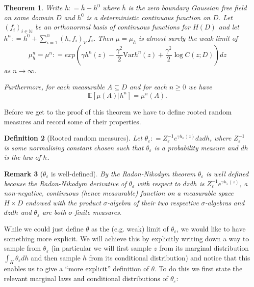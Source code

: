 \documentclass[11pt,reqno]{amsart}
\numberwithin{equation}{section}
\newtheorem{thm}{Theorem}[section]
\newtheorem{defi}[thm]{Definition}
\newtheorem{rem}[thm]{Remark}
\newcommand{\deq}{\mathrel{\mathop:}=}
\newcommand{\eps}{\varepsilon}
\begin{document}
\begin{thm}\label{thm:approximationofhwithhn}
	Write $h\deq \overline h+h^0$ where $\overline h$ is the zero boundary Gaussian free field on some domain $D$ and $h^0$ is a deterministic continuous function on $D$. Let $(f_i)_{i\in\mathbb N}$ be an orthonormal basis of continuous functions for $H(D)$ and let $h^n\deq h^0+\sum_{i=1}^n (h,f_i)_\nabla f_i$. Then $\mu=\mu_h$ is almost surely the weak limit of $$\mu_h^n=\mu^n\deq exp\left(\gamma h^n(z)-\frac{\gamma^2}{2}\text{Var}h^n(z)+\frac{\gamma^2}{2}\log C(z;D) \right)dz$$
	as $n\rightarrow\infty$.
	
	Furthermore, for each measurable $A\subseteq D$ and for each $n\geq 0$ we have $$\mathbb E[\mu(A)|h^n]=\mu^n(A).$$
\end{thm}

Before we get to the proof of this theorem we have to define rooted random measures and record some of their properties.

\begin{defi}[Rooted random measures]
	Let $\theta_\eps\deq Z^{-1}_\eps e^{\gamma h_\eps(z)}dzdh$, where $Z^{-1}_\eps$ is some normalising constant chosen such that $\theta_\eps$ is a probability measure and $dh$ is the law of $h$.
\end{defi}
\begin{rem}[$\theta_\eps$ is well-defined]
	By the Radon-Nikodym theorem $\theta_\eps$ is well defined because the Radon-Nikodym derivative of $\theta_\eps$ with respect to $dzdh$ is $Z^{-1}_\eps e^{\gamma h_\eps(z)}$, a non-negative, continuous (hence measurable) function on a measurable space $H\times D$ endowed with the product $\sigma$-algebra of their two respective $\sigma$-algebras and $dzdh$ and $\theta_\eps$ are both $\sigma$-finite measures.
\end{rem}

While we could just define $\theta$ as the (e.g. weak) limit of $\theta_\eps$, we would like to have something more explicit. We will achieve this by explicitly writing down a way to sample from $\theta_\eps$ (in particular we will first sample $z$ from its marginal distribution $\int_H\theta_\eps dh$ and then sample $h$ from its conditional distribution) and notice that this enables us to give a ``more explicit'' definition of $\theta$.
To do this we first state the relevant marginal laws and conditional distributions of $\theta_\eps$:
\end{document}

